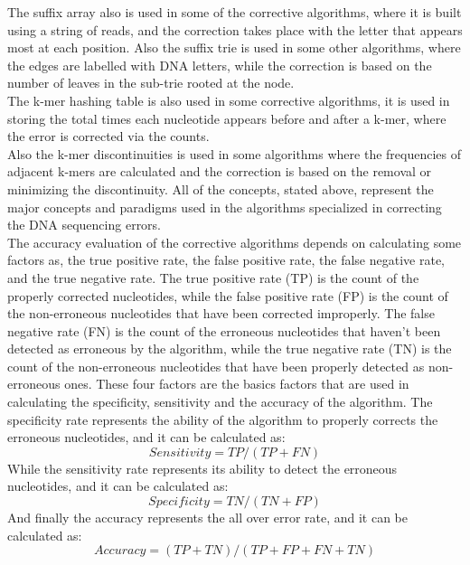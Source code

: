 \documentclass[12pt]{llncs}
\begin{document}
The suffix array also is used in some of the corrective algorithms, where it is built using a string of reads, and the correction takes place with the letter that appears most at each position. Also the suffix trie is used in some other algorithms, where the edges are labelled with DNA letters, while the correction is based on the number of leaves in the sub-trie rooted at the node.
\\
The k-mer hashing table is also used in some corrective algorithms, it is used in storing the total times each nucleotide appears before and after a k-mer, where the error is corrected via the counts. 
\\
Also the k-mer discontinuities is used in some algorithms where the frequencies of adjacent k-mers are calculated and the correction is based on the removal or minimizing the discontinuity.
All of the concepts, stated above, represent the major concepts and paradigms used in the algorithms specialized in correcting the DNA sequencing errors.
\\
The accuracy evaluation of the corrective algorithms depends on calculating some factors as, the true positive rate, the false positive rate, the false negative rate, and the true negative rate. The true positive rate (TP) is the count of the properly corrected nucleotides, while the false positive rate (FP) is the count of the non-erroneous nucleotides that have been corrected improperly. The false negative rate (FN) is the count of the erroneous nucleotides that haven't been detected as erroneous by the algorithm, while the true negative rate (TN) is the count of the non-erroneous nucleotides that have been properly detected as non-erroneous ones. These four factors are the basics factors that are used in calculating the specificity, sensitivity and the accuracy of the algorithm. The specificity rate represents the ability of the algorithm to properly corrects the erroneous nucleotides, and it can be calculated as: 
\[ Sensitivity = TP/(TP+FN) \] 
While the sensitivity rate represents its ability to detect the erroneous nucleotides, and it can be calculated as: 
\[ Specificity = TN/(TN+FP) \] 
And finally the accuracy represents the all over error rate, and it can be calculated as: 
\[ Accuracy = (TP+TN)/(TP+FP+FN+TN) \] 
\end{document}
